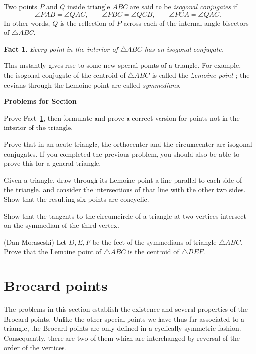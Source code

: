 \documentclass[12pt]{book}
\newcounter{exc}
\numberwithin{exc}{section}
\numberwithin{figure}{section}
\newenvironment{exer}{\vspace{0.1in}
\noindent \textbf{Problems for Section~\thesection} \vspace{0.1in}
\begin{list}{\arabic{exc}.}{\usecounter{exc}}}{\end{list}}
\newtheorem{fact}[theorem]{Fact}
\numberwithin{equation}{theorem}
\def\ii{\item}
\begin{document}
Two points $P$ and $Q$ inside triangle $ABC$ are said to be 
\emph{isogonal conjugates} 
if 
\[
\angle PAB = \angle QAC, \qquad
\angle PBC = \angle QCB, \qquad
\angle PCA = \angle QAC.
\]
In other words, $Q$ is the reflection of $P$ across each of the internal 
angle bisectors of $\triangle ABC$.

\begin{fact} \label{fact:isogonal}
Every point in the interior of $\triangle ABC$ has an isogonal
conjugate.
\end{fact}
This instantly gives rise to some new special points of a triangle.
For example, the isogonal conjugate of the centroid of $\triangle ABC$
is called the \emph{Lemoine point} 
; 
the cevians through the Lemoine point are called \emph{symmedians}.

\begin{exer}
\ii \label{ex:isogonal}
Prove Fact~\ref{fact:isogonal}, then formulate and prove a correct
version for points not in the interior of the triangle.

\ii
Prove that in an acute triangle,
the orthocenter and the circumcenter are isogonal conjugates. If you
completed the previous problem, you should also be able to prove this
for a general triangle.

\ii
Given a triangle, draw through its Lemoine point 
a line parallel to each side of the 
triangle, and consider the intersections of that line with the other two 
sides. Show that the resulting six points are concyclic.

\ii \label{ex:tangents symm}
Show that the tangents to the circumcircle of a triangle at two vertices 
intersect on the symmedian of the third vertex.

\ii (Dan Moraseski) 
Let $D, E, F$ be the feet of the symmedians of triangle
$\triangle ABC$. Prove that the Lemoine point of $\triangle ABC$ is the 
centroid of $\triangle DEF$.

\end{exer}
\section{Brocard points}

The problems in this section establish the existence and several 
properties of the Brocard points. Unlike the other special points
we have thus far associated to a triangle, the Brocard points are only 
defined in a cyclically symmetric fashion. Consequently, there are two of them
which are interchanged by reversal of the order of the vertices.
\end{document}
